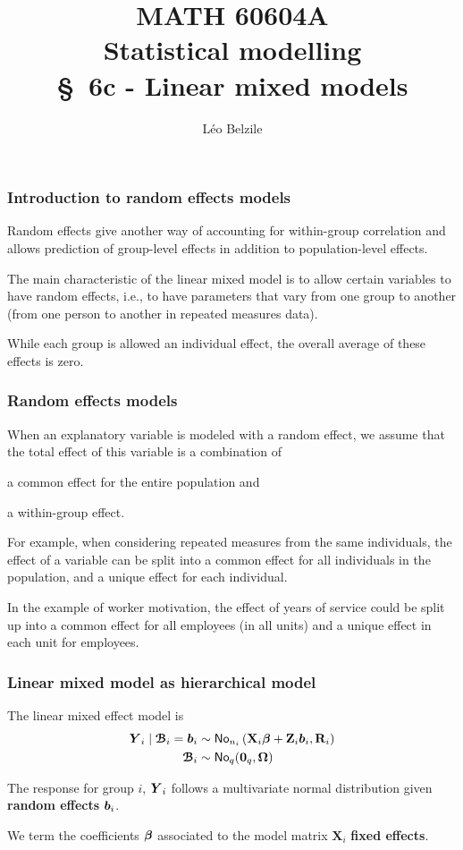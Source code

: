 \documentclass{beamer}
\title[\color{white}{MATH 60604A \S~6c - Linear mixed models}]{\texorpdfstring{MATH 60604A \\Statistical modelling \\ \S~6c - Linear mixed models}{MATH 60604A \\Statistical modelling \\ \S~6c - Linear mixed models}}
\author{Léo Belzile}
\institute{HEC Montréal\\
Department of Decision Sciences}
\date{}
\begin{document}
\frame{\titlepage}



\begin{frame}
\frametitle{Introduction to random effects models}
 Random effects give another way of accounting for within-group correlation and allows prediction of group-level effects in addition to population-level effects.
 \bi \item The main characteristic of the \alert{linear mixed model} is to allow certain variables to have \alert{random effects}, i.e., \alert{to have parameters that vary from one group to another} (from one person to another in repeated measures data). 
\item While each group is allowed an individual effect, the overall average of these effects is zero.
\ei
\end{frame}

\begin{frame}[fragile]
\frametitle{Random effects models}
\bi
\item When an explanatory variable is modeled with a random effect, we assume that \alert{the total effect of this variable is a combination of}
\be

\item a \alert{common effect} for the entire population and  
\item a \alert{within-group effect}. 
\ee
\item For example, when considering repeated measures from the same individuals, the effect of a variable can be split into a common effect for all individuals in the population, and a unique effect for each individual. 
\item In the example of worker motivation, the effect of years of service could be split up into a common effect for all employees (in all units) and a unique effect in each unit for employees.
\ei
\end{frame}
\begin{frame}
 \frametitle{Linear mixed model as hierarchical model}
The linear mixed effect model is 
 \begin{align*}
  \boldsymbol {Y}_i \mid \boldsymbol {\mathcal{B}}_i =\boldsymbol {b}_i &\sim \mathsf{No}_{n_i}\left( \mathbf{X}_i \boldsymbol {\beta} + \mathbf{Z}_i\boldsymbol {b}_i, \mathbf{R}_i\right) \\
  \boldsymbol {\mathcal{B}}_i & \sim \mathsf{No}_{q}( \boldsymbol {0}_q, \boldsymbol {\Omega})
 \end{align*}

 \bi \item 
 The response for group $i$, $\boldsymbol {Y}_i$ follows a multivariate normal distribution given \textbf{random effects} $\boldsymbol {b}_i$.
 \item 
 We term the coefficients $\boldsymbol {\beta}$ associated to the model matrix $\mathbf{X}_i$ \textbf{fixed effects}.
 \ei 
\end{frame}
\end{document}
